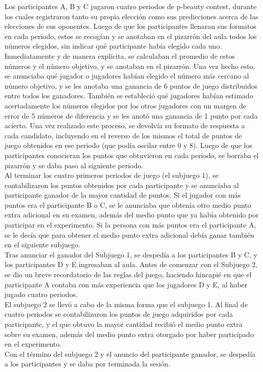 Los participantes A, B y C jugaron cuatro periodos de p-beauty contest, durante los cuales registraron tanto su propia elección como sus predicciones acerca de las elecciones de sus oponentes. Luego de que los participantes llenaran sus formatos en cada periodo, estos se recogían y se anotaban en el pizarrón del aula todos los números elegidos, sin indicar qué participante había elegido cada uno. Inmediatamente y de manera explícita, se calculaban el promedio de estos números y el número objetivo, y se anotaban en el pizarrón. Una vez hecho esto, se anunciaba qué jugador o jugadores habían elegido el número más cercano al número objetivo, y se les anotaba una ganancia de 6 puntos de juego distribuidos entre todos los ganadores. También se estableció qué jugadores habían estimado acertadamente los números elegidos por los otros jugadores con un margen de error de 5 números de diferencia y se les anotó una ganancia de 1 punto por cada acierto. Una vez realizado este proceso, se devolvía su formato de respuesta a cada candidato, incluyendo en el reverso de los mismos el total de puntos de juego obtenidos en ese periodo (que podía oscilar entre 0 y 8). Luego de que los participantes conocieran los puntos que obtuvieron en cada periodo, se borraba el pizarrón y se daba paso al siguiente periodo.\\

Al terminar los cuatro primeros periodos de juego (el subjuego 1), se contabilizaron los puntos obtenidos por cada participante y se anunciaba al participante ganador de la mayor cantidad de puntos. Si el jugador con más puntos era el participante B o C, se le anunciaba que obtenía otro medio punto extra adicional en su examen, además del medio punto que ya había obtenido por participar en el experimento. Si la persona con más puntos era el participante A, se le decía que para obtener el medio punto extra adicional debía ganar también en el siguiente subjuego.\\

Tras anunciar el ganador del Subjuego 1, se despedía a los participantes B y C, y los participantes D y E ingresaban al aula. Antes de comenzar con el Subjuego 2, se dio un breve recordatorio de las reglas del juego, haciendo hincapié en que el participante A contaba con más experiencia que los jugadores D y E, al haber jugado cuatro periodos.\\

El subjuego 2 se llevó a cabo de la misma forma que el subjuego 1. Al final de cuatro periodos se contabilizaron los puntos de juego adquiridos por cada participante, y el que obtuvo la mayor cantidad recibió el medio punto extra sobre su examen, además del medio punto extra otorgado por haber participado en el experimento.\\

Con el término del subjuego 2 y el anuncio del participante ganador, se despedía a los participantes y se daba por terminada la sesión.\\

